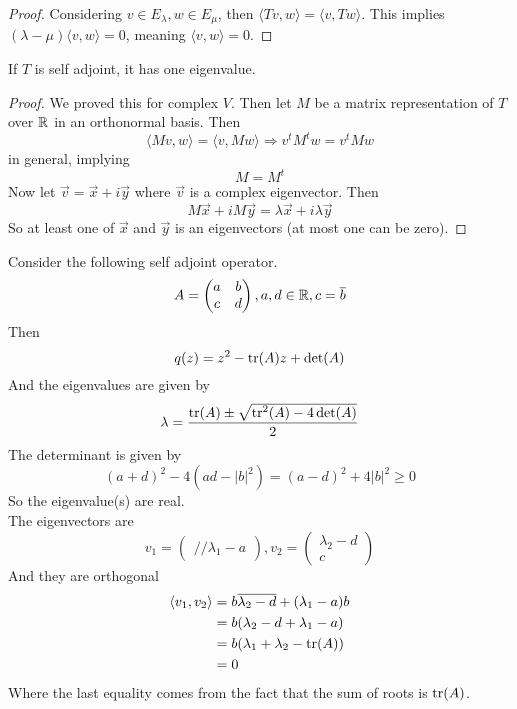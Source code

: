 \documentclass[12pt]{article}
\begin{document}
\begin{proof}
	Considering $v \in E_\lambda, w \in E_\mu$, then $\langle Tv,w \rangle = \langle v,Tw \rangle$. This implies $(\lambda-\mu)\langle v,w \rangle = 0$, meaning $\langle v,w \rangle = 0$.
\end{proof}

\begin{lem}
	If $T$ is self adjoint, it has one eigenvalue.
\end{lem}

\begin{proof}
	We proved this for complex $V$. Then let $M$ be a matrix representation of $T$ over $\mathbb{R}$ in an orthonormal basis. Then
	$$\langle Mv, w \rangle = \langle v,Mw \rangle \Rightarrow v^tM^tw = v^tMw$$
	in general, implying
	$$M = M^t$$
	Now let $\vec{v} = \vec{x} + i\vec{y}$ where $\vec{v}$ is a complex eigenvector. Then
	$$M\vec{x} + iM\vec{y} = \lambda\vec{x} + i\lambda\vec{y}$$
	So at least one of $\vec{x}$ and $\vec{y}$ is an eigenvectors (at most one can be zero).
\end{proof}

\begin{ex}
	Consider the following self adjoint operator.
	$$A = \begin{pmatrix} a & b \\ c & d \end{pmatrix}, a,d \in \mathbb{R}, c = \overline{b}$$
	Then
	$$q(z) = z^2 - \operatorname{tr}(A)z + \det(A)$$
	And the eigenvalues are given by
	$$\lambda = \frac{\operatorname{tr}(A)\pm\sqrt{\operatorname{tr}^2(A) - 4\det(A)}}{2}$$
	The determinant is given by
	$$(a+d)^2 - 4(ad-|b|^2) = (a-d)^2 + 4|b|^2 \geq 0$$
	So the eigenvalue(s) are real. \\
	The eigenvectors are
	$$v_1 = \begin{pmatrix}  // \lambda_1 - a \end{pmatrix}, v_2 = \begin{pmatrix} \lambda_2 - d \\ c \end{pmatrix}$$
	And they are orthogonal
	\begin{align*}
		\langle v_1,v_2 \rangle &= b\overline{\lambda_2 - d} + (\lambda_1 - a)b \\
					&= b(\lambda_2 - d + \lambda_1 - a) \\
					&= b(\lambda_1 + \lambda_2 - \operatorname{tr}(A)) \\
					&= 0
	\end{align*}
	Where the last equality comes from the fact that the sum of roots is $\operatorname{tr}(A)$.
\end{ex}
\end{document}
